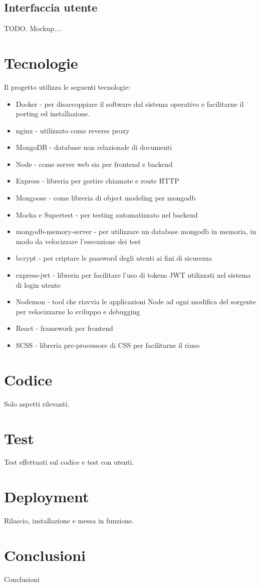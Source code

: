 \documentclass{report}
\begin{document}
\subsection{Interfaccia utente}
TODO. Mockup....

\section{Tecnologie}
Il progetto utilizza le seguenti tecnologie:
\begin{itemize}
    \item Docker - per disaccoppiare il software dal sistema operativo e facilitarne il porting ed installazione.
    \item nginx - utilizzato come reverse proxy
    \item MongoDB - database non relazionale di documenti
    \item Node - come server web sia per frontend e backend
    \item Express - libreria per gestire chiamate e route HTTP
    \item Mongoose - come libreria di object modeling per mongodb
    \item Mocha e Supertest - per testing automatizzato nel backend
    \item mongodb-memory-server - per utilizzare un database mongodb in memoria, in modo da velocizzare l'esecuzione dei test
    \item bcrypt - per criptare le password degli utenti ai fini di sicurezza
    \item express-jwt - libreria per facilitare l'uso di tokens JWT utilizzati nel sistema di login utente
    \item Nodemon - tool che riavvia le applicazioni Node ad ogni modifica del sorgente
    per velocizzarne lo sviluppo e debugging
    \item React - framework per frontend
    \item SCSS - libreria pre-processore di CSS per facilitarne il riuso
\end{itemize}

\section{Codice}
Solo aspetti rilevanti.

\section{Test}
Test effettuati sul codice e test con utenti.

\section{Deployment}
Rilascio, installazione e messa in funzione.


\section{Conclusioni}
Conclusioni



\end{document}
